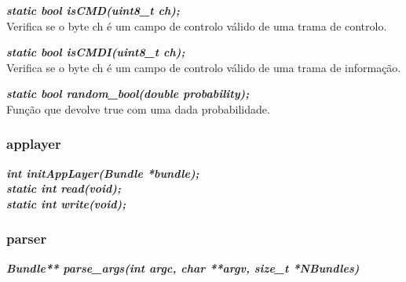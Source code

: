 \documentclass[a4paper]{article}
\begin{document}
\noindent\textbf{\textit{static bool isCMD(uint8\_t ch);}}\\
Verifica se o byte ch é um campo de controlo válido de uma trama de controlo. \linebreak

\noindent\textbf{\textit{static bool isCMDI(uint8\_t ch);}}\\
Verifica se o byte ch é um campo de controlo válido de uma trama de informação. \linebreak

\noindent\textbf{\textit{static bool random\_bool(double probability);}}\\
Função que devolve true com uma dada probabilidade.

\subsubsection{applayer}
\noindent\textbf{\textit{int initAppLayer(Bundle *bundle);}}\\

\noindent\textbf{\textit{static int read(void);}}\\

\noindent\textbf{\textit{static int write(void);}}\\

\subsubsection{parser}

\noindent\textbf{\textit{Bundle** parse\_args(int argc, char **argv, size\_t *NBundles)}}\\
\end{document}
